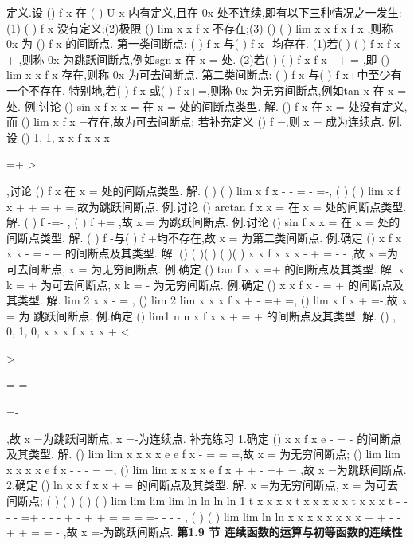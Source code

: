 \textcolor{lyred}{定义}.设
()
f x 在
(
)
U x
\circ 
内有定义,且在
0x 处不连续,即有以下三种情况之一发生: 
(1)
(
)
f x
没有定义;(2)极限
()
lim
x
x f x
\to 
不存在;(3)
()
(
)
lim
x
x f x
f x
\to 
\neq 
,则称
0x 为 
()
f x 的\textcolor{lyred}{间断点}. 
\textcolor{lyred}{第一类间断点}: (
)
f x-与(
)
f x+均存在. 
(1)若(
)
(
)
f x
f x
-
+
\neq 
,则称
0x 为\textcolor{lyred}{跳跃间断点},例如sgn x 在
x =
处. 
(2)若(
)
(
)
f x
f x
-
+
=
,即
()
lim
x
x f x
\to 
存在,则称
0x 为\textcolor{lyred}{可去间断点}. 
\textcolor{lyred}{第二类间断点}: (
)
f x-与(
)
f x+中至少有一个不存在. 
特别地,若(
)
f x-或(
)
f x+=\infty ,则称
0x 为\textcolor{lyred}{无穷间断点},例如tan x 在
x
\pi 
=\pm 
处. 
\textcolor{lyred}{例}.讨论
()
sin x
f x
x
=
在
x =
处的间断点类型. 
解.
()
f x 在
x =
处没有定义,而
()
lim
x
f x
\to 
=存在,故为可去间断点; 
若补充定义
()
f
=,则
x =
成为连续点. 
\textcolor{lyred}{例}.设
()
1,
1,
x
x
f x
x
x
-
\le 

=+
>

,讨论
()
f x 在
x =
处的间断点类型. 
解. (
)
(
)
lim
x
f
x
-
-
\to 
=
-
=-, (
)
(
)
lim
x
f
x
+
+
\to 
=
+
=,故为跳跃间断点. 
\textcolor{lyred}{例}.讨论
()
arctan
f x
x
=
在
x =
处的间断点类型. 
解. (
)
f
\pi 
-=-
, (
)
f
\pi 
+=
,故
x =
为跳跃间断点. 
\textcolor{lyred}{例}.讨论
()
sin
f x
x
=
在
x =
处的间断点类型. 
解. (
)
f
-与(
)
f
+均不存在,故
x =
为第二类间断点. 
\textcolor{lyred}{例}.确定
()
x
f x
x
x
-
=
-
+
的间断点及其类型.\textcolor{lyred}{ }
解.
()
(
)(
)
(
)(
)
x
x
f x
x
x
-
+
=
-
-
,故
x =为可去间断点,
x =
为无穷间断点. 
\textcolor{lyred}{例}.确定
()
tan
f x
x
=+
的间断点及其类型. 
解.
x
k
\pi 
\pi 
=
+
为可去间断点,
x
k
\pi 
\pi 
=
-
为无穷间断点. 
\textcolor{lyred}{例}.确定
()
x
x
f x
-
=
+
的间断点及其类型. 
解.
lim 2
x
x
-
\to 
=
,
()
lim 2
lim
x
x
x
f
x
+
-
\to 
\to 
=+\infty \Rightarrow 
=,
()
lim
x
f
x
+
\to 
=-,故
x =
为 
跳跃间断点. 
\textcolor{lyred}{例}.确定
()
lim1
n
n
x
f x
x
\to \infty 
+
=
+
的间断点及其类型.\textcolor{lyred}{ }
解.
()
,
0,
1,
0,
x
x
x
f x
x
x
+
<

>

=
=


=-

,故
x =为跳跃间断点,
x =-为连续点. 
\textcolor{lyred}{补充练习 }
1.确定
()
x
x
f x
e -
=
-
的间断点及其类型.\textcolor{lyred}{ }
解.
()
lim
lim
x
x
x
x
e
e
f x
-
\to 
\to 
=
=\Rightarrow 
=\infty ,故
x =
为无穷间断点; 
()
lim
lim
x
x
x
x
e
f
x
-
-
-
\to 
\to 
=
\Rightarrow 
=,
()
lim
lim
x
x
x
x
e
f
x
+
+
-
\to 
\to 
=+\infty \Rightarrow 
=
,故
x =为跳跃间断点. 
2.确定
()
ln
x x
f x
x
+
=
的间断点及其类型. 
解.
x =为无穷间断点,
x =
为可去间断点; 
(
)
(
)
(
)
(
)
lim
lim
lim
lim
ln
ln
ln
ln 1
t x
x
x
x
t
x x
x x
x
t
x
x
x
t
-
-
-
-
=+
\to -
\to -
\to -
\to 
+
-
+
+
=
=
=
=-
-
-
-
, 
(
)
(
)
lim
lim
ln
ln
x
x
x x
x x
x
x
+
+
\to -
\to -
+
+
=
=
-
,故
x =-为跳跃间断点. 
\vspace{6pt}
{\large \bfseries \textcolor{lyred}{第1.9 节 连续函数的运算与初等函数的连续性}}


